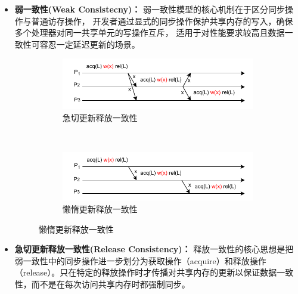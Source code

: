 {\begin{itemize}
        \item \textbf{弱一致性(Weak Consistecny)：} 弱一致性模型的核心机制在于区分同步操作与普通访存操作，
              开发者通过显式的同步操作保护共享内存的写入，确保多个处理器对同一共享单元的写操作互斥，
              适用于对性能要求较高且数据一致性可容忍一定延迟更新的场景。

              \begin{figure}[!htbp]
                  \centering
                  \begin{subfigure}[b]{0.8\textwidth}
                      \includegraphics[width=\textwidth]{Img/急切更新释放一致性.drawio.pdf}
                      \caption{急切更新释放一致性}
                      \label{fig:eager-release-consistency}
                  \end{subfigure}
                  \\
                  \begin{subfigure}[b]{0.8\textwidth}
                      \includegraphics[width=\textwidth]{Img/懒惰更新释放一致性.drawio.pdf}
                      \caption{懒惰更新释放一致性}
                      \label{fig:lazy-release-consistency}
                  \end{subfigure}

                  \label{fig:oaspl}
              \end{figure}

        \item \textbf{急切更新释放一致性(Release Consistency)：} 释放一致性的核心思想是把弱一致性中的同步操作进一步划分为获取操作（acquire）和释放操作（release）。只在特定的释放操作时才传播对共享内存的更新以保证数据一致性，而不是在每次访问共享内存时都强制同步。


\end{itemize}}
